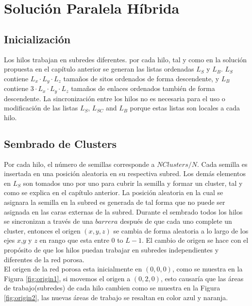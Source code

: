 \section{Solución Paralela Híbrida}
\subsection{Inicialización}
\label{subsec:pinit}
Los hilos trabajan en subredes diferentes. por cada hilo, tal y como en la solución propuesta en el capítulo anterior se generan las listas ordenadas $L_S$ y $L_B$. $L_S$ contiene $L_x \cdot L_y \cdot L_z$ tamaños de sitos ordenados de forma descendente, y $L_B$ contiene $3\cdot L_x \cdot L_y \cdot L_z$ tamaños de enlaces ordenados también de forma descendente. La sincronización entre los hilos no es necesaria para el uso o modificación de las listas $L_S$, $L_{SC}$ and $L_B$ porque estas listas son locales a cada hilo.

\subsection{Sembrado de Clusters}
\label{subsec:pseeding}
Por cada hilo, el número de semillas corresponde a $NClusters/N$. Cada semilla es insertada en una posición aleatoria en su respectiva subred. Los demás elementos en $L_S$ son tomados uno por uno para cubrir la semilla y formar un cluster, tal y como se explica en el capítulo anterior. La posición aleatoria en la cual se asignara la semilla en la subred es generada de tal forma que no puede ser asignada en las caras externas de la subred. Durante el sembrado todos los hilos se sincronizan a través de una $barrera$ después de que cada uno complete un cluster, entonces el origen $(x, y, z)$ se cambia  de forma aleatoria a lo largo de los ejes $x$,$y$ y $z$ en rango que esta entre $0$ to $L-1$. El cambio de origen se hace con el propósito de que los hilos puedan trabajar en subredes independientes y diferentes de la red porosa.\\

El origen de la red porosa esta inicialmente en $(0,0,0)$, como se muestra en la Figura \ref{fig:origin1}, si movemos el origen a $(0,2,0)$, esto causaría que las áreas de trabajo(subredes) de cada hilo cambien como se muestra en la Figura \ref{fig:origin2}, las nuevas áreas de trabajo se resaltan en color azul y naranja.\\

